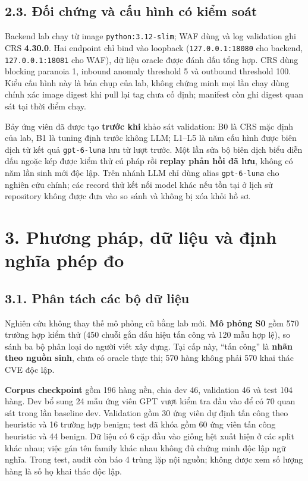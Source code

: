 \documentclass[
  10pt,
  a4paper,
]{article}
\begin{document}
\subsection{2.3. Đối chứng và cấu hình có kiểm
soát}\label{ux111ux1ed1i-chux1ee9ng-vuxe0-cux1ea5u-huxecnh-cuxf3-kiux1ec3m-souxe1t}

Backend lab chạy từ image \texttt{python:3.12-slim}; WAF dùng
 và log validation ghi CRS
\textbf{4.30.0}. Hai endpoint chỉ bind vào loopback
(\texttt{127.0.0.1:18080} cho backend, \texttt{127.0.0.1:18081} cho
WAF), dữ liệu oracle được đánh dấu tổng hợp. CRS dùng blocking paranoia
1, inbound anomaly threshold 5 và outbound threshold 100. Kiểu cấu hình
này là bản chụp của lab, không chứng minh mọi lần chạy dùng chính xác
image digest khi pull lại tag chưa cố định; manifest còn ghi digest quan
sát tại thời điểm chạy.

Bảy ứng viên đã được tạo \textbf{trước khi} khảo sát validation: B0 là
CRS mặc định của lab, B1 là tuning định trước không LLM; L1--L5 là năm
cấu hình được biên dịch từ kết quả \texttt{gpt-6-luna} lưu từ lượt
trước. Một lần sửa bộ biên dịch biểu diễn dấu ngoặc kép được kiểm thử cú
pháp rồi \textbf{replay phản hồi đã lưu}, không có năm lần sinh mới độc
lập. Trên nhánh LLM chỉ dùng alias \texttt{gpt-6-luna} cho nghiên cứu
chính; các record thử kết nối model khác nếu tồn tại ở lịch sử
repository không được đưa vào so sánh và không bị xóa khỏi hồ sơ.

\section{3. Phương pháp, dữ liệu và định nghĩa phép
đo}\label{phux1b0ux1a1ng-phuxe1p-dux1eef-liux1ec7u-vuxe0-ux111ux1ecbnh-nghux129a-phuxe9p-ux111o}

\subsection{3.1. Phân tách các bộ dữ
liệu}\label{phuxe2n-tuxe1ch-cuxe1c-bux1ed9-dux1eef-liux1ec7u}

Nghiên cứu không thay thế mô phỏng cũ bằng lab mới. \textbf{Mô phỏng S0}
gồm 570 trường hợp kiểm thử (450 chuỗi gắn dấu hiệu tấn công và 120 mẫu
hợp lệ), so sánh ba bộ phân loại do người viết xây dựng. Tại cấp này,
``tấn công'' là \textbf{nhãn theo nguồn sinh}, chưa có oracle thực thi;
570 hàng không phải 570 khai thác CVE độc lập.

\textbf{Corpus checkpoint}  gồm
196 hàng nền, chia dev 46, validation 46 và test 104 hàng. Dev bổ sung
24 mẫu ứng viên GPT vượt kiểm tra đầu vào để có 70 quan sát trong lần
baseline dev. Validation gồm 30 ứng viên dự định tấn công theo heuristic
và 16 trường hợp benign; test đã khóa gồm 60 ứng viên tấn công heuristic
và 44 benign. Dữ liệu có 6 cặp đầu vào giống hệt xuất hiện ở các split
khác nhau; việc gán tên family khác nhau không đủ chứng minh độc lập ngữ
nghĩa. Trong test, audit còn báo 4 trùng lặp nội nguồn; không được xem
số lượng hàng là số họ khai thác độc lập.
\end{document}

